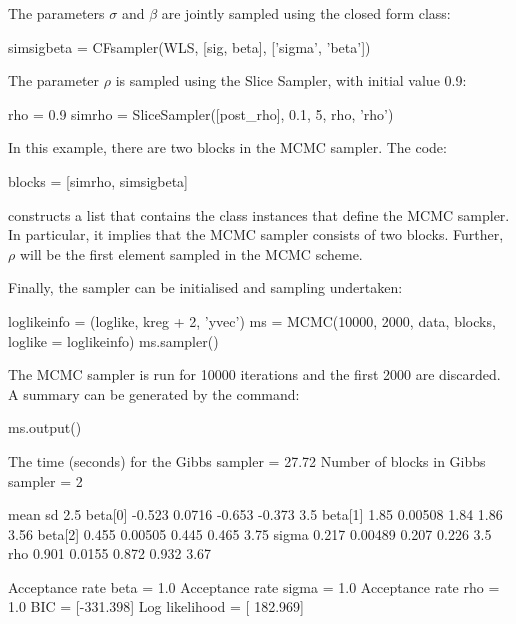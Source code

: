 \documentclass[article]{jss}
\begin{document}
The parameters $\sigma$ and $\beta$ are jointly sampled using the
closed form class:
\begin{Code}
simsigbeta = CFsampler(WLS, [sig, beta], ['sigma', 'beta'])
\end{Code}

The parameter $\rho$ is sampled using the Slice Sampler, with initial value 0.9:
\begin{Code}
rho = 0.9
simrho = SliceSampler([post_rho], 0.1, 5, rho, 'rho')
\end{Code}

In this example, there are two blocks in the MCMC sampler. The code:
\begin{Code}
blocks = [simrho, simsigbeta]
\end{Code}
constructs a  list that contains the
class instances that define the MCMC sampler. In particular, it
implies that the MCMC sampler consists of two blocks. Further,
$\rho$ will be the first element sampled in the MCMC scheme.


Finally, the sampler can be initialised and sampling undertaken:

\begin{Code}
loglikeinfo = (loglike, kreg + 2, 'yvec')
ms = MCMC(10000, 2000, data, blocks, loglike = loglikeinfo)
ms.sampler()
\end{Code}


The MCMC sampler is run for 10000
iterations and the first 2000 are discarded. A summary can be generated by the  command:

\begin{CodeChunk}
\begin{CodeInput}
ms.output()
\end{CodeInput}
\begin{CodeOutput}
The time (seconds) for the Gibbs sampler =  27.72
Number of blocks in Gibbs sampler =  2

                mean        sd       2.5%
   beta[0]    -0.523    0.0716     -0.653    -0.373        3.5
   beta[1]      1.85   0.00508       1.84      1.86       3.56
   beta[2]     0.455   0.00505      0.445     0.465       3.75
     sigma     0.217   0.00489      0.207     0.226        3.5
       rho     0.901    0.0155      0.872     0.932       3.67

Acceptance rate  beta  =  1.0
Acceptance rate  sigma  =  1.0
Acceptance rate  rho  =  1.0
BIC =  [-331.398]
Log likelihood =  [ 182.969]

\end{CodeOutput}
\end{CodeChunk}
\end{document}
